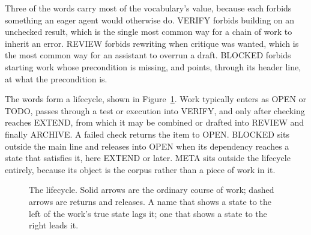 \documentclass[11pt]{article}
\newcommand{\st}[1]{\textsf{#1}}
\begin{document}
Three of the words carry most of the vocabulary's value, because each forbids something an eager agent would otherwise do. \st{VERIFY} forbids building on an unchecked result, which is the single most common way for a chain of work to inherit an error. \st{REVIEW} forbids rewriting when critique was wanted, which is the most common way for an assistant to overrun a draft. \st{BLOCKED} forbids starting work whose precondition is missing, and points, through its header line, at what the precondition is.

The words form a lifecycle, shown in Figure~\ref{fig:lifecycle}. Work typically enters as \st{OPEN} or \st{TODO}, passes through a test or execution into \st{VERIFY}, and only after checking reaches \st{EXTEND}, from which it may be combined or drafted into \st{REVIEW} and finally \st{ARCHIVE}. A failed check returns the item to \st{OPEN}. \st{BLOCKED} sits outside the main line and releases into \st{OPEN} when its dependency reaches a state that satisfies it, here \st{EXTEND} or later. \st{META} sits outside the lifecycle entirely, because its object is the corpus rather than a piece of work in it.

\begin{figure}[ht]
\centering
{}
\caption{The lifecycle. Solid arrows are the ordinary course of work; dashed arrows are returns and releases. A name that shows a state to the left of the work's true state lags it; one that shows a state to the right leads it.}
\label{fig:lifecycle}
\end{figure}
\end{document}
